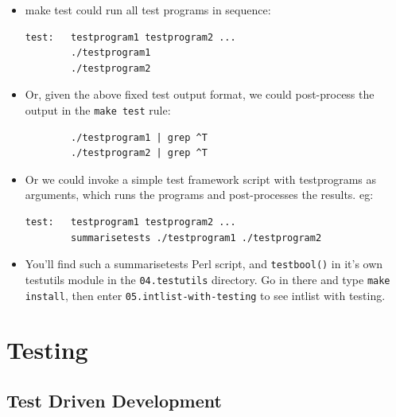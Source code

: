 \documentclass[handout]{beamer}
\begin{document}
\begin{frame}[fragile]
    \begin{itemize}
      \item
      \alert{make test} could run all test programs in sequence:
\begin{verbatim}
test:   testprogram1 testprogram2 ...
        ./testprogram1
        ./testprogram2
\end{verbatim}

      \item
      Or, given the above fixed test output format, we could post-process
      the output in the \verb+make test+ rule:
\begin{verbatim}
        ./testprogram1 | grep ^T
        ./testprogram2 | grep ^T
\end{verbatim}

      \item
      Or we could invoke a simple
      test framework script with testprograms as arguments,
      which runs the programs and post-processes the results.  eg:

\begin{verbatim}
test:   testprogram1 testprogram2 ...
        summarisetests ./testprogram1 ./testprogram2
\end{verbatim}

      \item
      You'll find such a \alert{summarisetests} Perl script,
      and \verb+testbool()+ in it's own \alert{testutils} module
      in the \verb+04.testutils+ directory.  Go in there and type
      \verb+make install+, then enter \verb+05.intlist-with-testing+ to see
      \alert{intlist} with testing.

    \end{itemize}
\end{frame}

\section{Testing}
\subsection{Test Driven Development}
\end{document}
